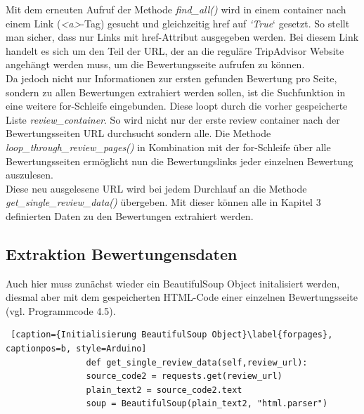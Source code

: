 \documentclass[a4paper,oneside,12pt]{report}
\begin{document}
				Mit dem erneuten Aufruf der Methode \textit{find\_all()} wird in einem container nach einem Link (\textit{<a>}-Tag) gesucht und gleichzeitig href auf \textit{‘True}‘ gesetzt. So stellt man sicher, dass nur Links mit href-Attribut ausgegeben werden. Bei diesem Link handelt es sich um den Teil der URL, der an die reguläre TripAdvisor Website angehängt werden muss, um die Bewertungsseite aufrufen zu können.
				\\
				Da jedoch nicht nur Informationen zur ersten gefunden Bewertung pro Seite, sondern zu allen Bewertungen extrahiert werden sollen, ist die Suchfunktion in eine weitere for-Schleife eingebunden. Diese loopt durch die vorher gespeicherte Liste \textit{review\_container}. So wird nicht nur der erste review container nach der Bewertungsseiten URL durchsucht sondern alle. Die Methode \textit{loop\_through\_review\_pages()} in Kombination mit der for-Schleife über alle Bewertungsseiten ermöglicht nun die Bewertungslinks jeder einzelnen Bewertung auszulesen.
				\\
				\newline
				Diese neu ausgelesene URL wird bei jedem Durchlauf an die Methode \textit{get\_single\_review\_data()} übergeben. Mit dieser können alle in Kapitel 3 definierten Daten zu den Bewertungen extrahiert werden.
	
	
	
			\subsection{Extraktion Bewertungensdaten}
			
				Auch hier muss zunächst wieder ein BeautifulSoup Object initalisiert werden, diesmal aber mit dem gespeicherten HTML-Code einer einzelnen Bewertungsseite (vgl. Programmcode 4.5).
				\\
				\begin{lstlisting} [caption={Initialisierung BeautifulSoup Object}\label{forpages}, captionpos=b, style=Arduino]
				def get_single_review_data(self,review_url):     
				source_code2 = requests.get(review_url)
				plain_text2 = source_code2.text
				soup = BeautifulSoup(plain_text2, "html.parser")
				\end{lstlisting}
	
	
			
\end{document}
